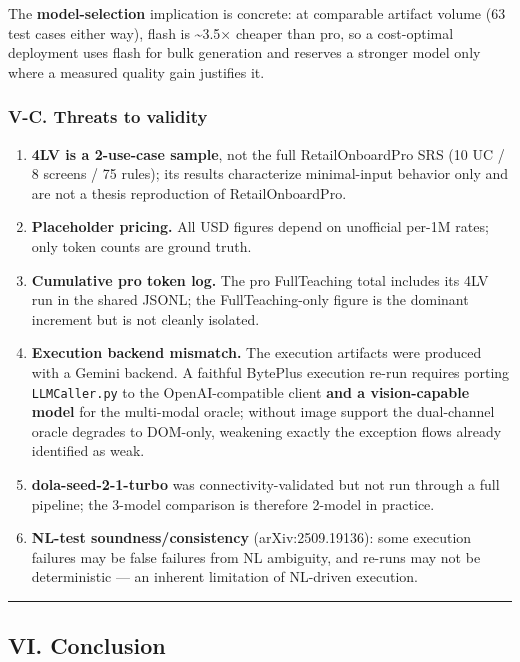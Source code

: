 \documentclass[
]{article}
\providecommand{\tightlist}{%
  \setlength{\itemsep}{0pt}\setlength{\parskip}{0pt}}
\begin{document}
The \textbf{model-selection} implication is concrete: at comparable
artifact volume (63 test cases either way), flash is \textasciitilde3.5×
cheaper than pro, so a cost-optimal deployment uses flash for bulk
generation and reserves a stronger model only where a measured quality
gain justifies it.

\subsubsection{V-C. Threats to validity}\label{v-c.-threats-to-validity}

\begin{enumerate}
\def\labelenumi{\arabic{enumi}.}
\tightlist
\item
  \textbf{4LV is a 2-use-case sample}, not the full RetailOnboardPro SRS
  (10 UC / 8 screens / 75 rules); its results characterize minimal-input
  behavior only and are not a thesis reproduction of RetailOnboardPro.
\item
  \textbf{Placeholder pricing.} All USD figures depend on unofficial
  per-1M rates; only token counts are ground truth.
\item
  \textbf{Cumulative pro token log.} The pro FullTeaching total includes
  its 4LV run in the shared JSONL; the FullTeaching-only figure is the
  dominant increment but is not cleanly isolated.
\item
  \textbf{Execution backend mismatch.} The execution artifacts were
  produced with a Gemini backend. A faithful BytePlus execution re-run
  requires porting \texttt{LLMCaller.py} to the OpenAI-compatible client
  \textbf{and a vision-capable model} for the multi-modal oracle;
  without image support the dual-channel oracle degrades to DOM-only,
  weakening exactly the exception flows already identified as weak.
\item
  \textbf{dola-seed-2-1-turbo} was connectivity-validated but not run
  through a full pipeline; the 3-model comparison is therefore 2-model
  in practice.
\item
  \textbf{NL-test soundness/consistency} (arXiv:2509.19136): some
  execution failures may be false failures from NL ambiguity, and
  re-runs may not be deterministic --- an inherent limitation of
  NL-driven execution.
\end{enumerate}

\begin{center}\rule{0.5\linewidth}{0.5pt}\end{center}

\subsection{VI. Conclusion}\label{vi.-conclusion}
\end{document}
